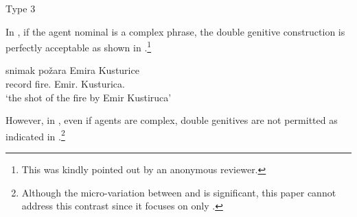 \documentclass[output=paper,colorlinks,citecolor=brown,newtxmath]{langsci/langscibook}
\begin{document}
\begin{exe}
\ex\label{razG}  {Type 3}
\begin{xlist}

{}
\end{xlist}
\end{exe}

\noindent In , if the agent nominal is a complex phrase, the double genitive construction is perfectly acceptable as shown in .\footnote{
			This was kindly pointed out by an anonymous reviewer.}

\begin{exe}
\ex\label{dgsc} %
\gll snimak požara Emira Kusturice\\
	record fire.{\GEN} Emir.{\GEN} Kusturica.{\GEN}\\
\trans `the shot of the fire by Emir Kustiruca'
\end{exe}

\noindent
However, in , even if agents are complex, double genitives are not permitted as indicated in .\footnote{
			Although the micro-variation between   and   is significant, this paper cannot address this contrast since it focuses on only .}

\begin{exe}
\ex\label{dgr} %
\begin{xlist}
\end{xlist}
\end{exe}
\end{document}
